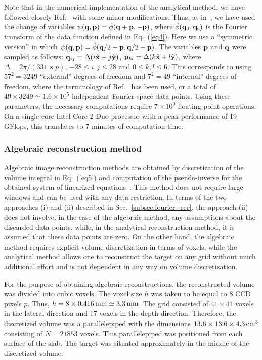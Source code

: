 Note that in the numerical implementation of the analytical method, we
have followed closely Ref.~\cite{konecky_08_1} with some minor
modifications. Thus, as in~\cite{konecky_08_1}, we have used the
change of variables $\psi({\bf q}, {\bf p}) = \tilde{\phi}({\bf q} +
{\bf p}, -{\bf p})$, where $\tilde{\phi}({\bf q}_{\rm d}, {\bf q}_{\rm
  s})$ is the Fourier transform of the data function defined in
Eq.~(\ref{eq4}).  Here we use a ``symmetric version'' in which
$\psi({\bf q}, {\bf p}) = \tilde{\phi}({\bf q}/2 + {\bf p}, {\bf q}/2
- {\bf p})$. The variables ${\bf p}$ and ${\bf q}$ were sampled as
follows: ${\bf q}_{ij} = \Delta (i\hat{\bf x} + j\hat{\bf y})$, ${\bf
  p}_{kl} = \Delta (k\hat{\bf x} + l\hat{\bf y})$, where $\Delta =
2\pi/(331\times p)$, $-28\le i,j\le 28$ and $0\le k,l\le 6$. This
corresponds to using $57^2=3249$ ``external'' degrees of freedom and
$7^2=49$ ``internal'' degrees of freedom, where the terminology of
Ref.~\cite{markel_04_4} has been used, or a total of
$49\times3249\simeq1.6\times10^5$ independent Fourier-space data
points. Using these parameters, the necessary computations require
$7\times 10^{9}$ floating point operations. On a single-core Intel
Core 2 Duo processor with a peak performance of 19 GFlops, this
translates to 7 minutes of computation time.

\subsubsection{Algebraic reconstruction method}
\label{sec:algrec}

Algebraic image reconstruction methods are obtained by discretization of the volume integral in Eq.~(\ref{eq5}) and computation of the pseudo-inverse for the obtained system of linearized equations~\cite{gonatas_95_1}.  This method does not require large windows and can be used with any data restriction. In terms of the two approaches (i) and (ii) described in Sec.~\ref{subsec:fourier_rec}, the approach (ii) does not involve, in the case of the algebraic
method, any assumptions about the discarded data points, while, in the analytical reconstruction method, it is assumed that these data points are zero.  On the other hand, the algebraic method requires explicit volume discretization in terms of voxels, while the analytical method allows one to reconstruct the target on any grid without much additional effort and is not dependent in any way on volume discretization.

For the purpose of obtaining algebraic reconstructions, the reconstructed volume was divided into cubic voxels. The voxel size $h$ was taken to be equal to 8 CCD pixels $p$. Thus, $h=8\times 0.416\,{\rm mm}\simeq 3.3\,{\rm mm}$. The grid consisted of $41\times
41$ voxels in the lateral direction and 17 voxels in the depth direction. Therefore, the discretized volume was a parallelepiped with the dimensions $13.6\times 13.6\times 4.3\,{\rm cm}^3$ consisting of $N=21853$ voxels. This parallelepiped was positioned from each surface
of the slab. The target was situated approximately in the middle of the discretized volume.

